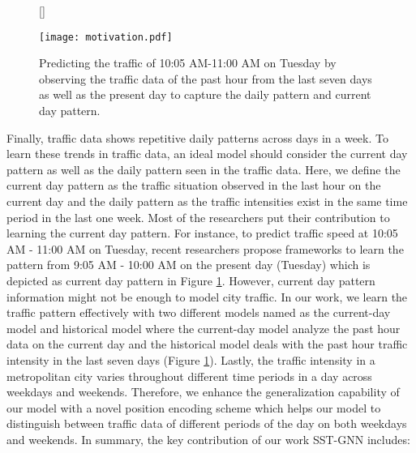 \documentclass[runningheads]{llncs}
\begin{document}
\begin{figure}[t]
[\FBwidth]
{\caption{\small Predicting the traffic of 10:05 AM-11:00 AM on Tuesday by observing the traffic data of the past hour from the last seven days as well as the present day to capture the daily pattern and current day pattern.}
\label{fig:motivation_his_cur}}
{\texttt{[image: motivation.pdf]}}
\end{figure}

Finally, traffic data shows repetitive daily patterns across days in a week. To learn these trends in traffic data, an ideal model should consider the current day pattern as well as the daily pattern seen in the traffic data.  Here, we define the current day pattern as the traffic situation  observed in the last hour on the current day and the daily pattern as the traffic intensities exist in the same time period in the last one week. Most of the researchers put their contribution to learning the current day pattern. For instance, to predict traffic speed at 10:05 AM - 11:00 AM on Tuesday, recent researchers propose frameworks to learn the pattern from 9:05 AM - 10:00 AM on the present day (Tuesday) which is depicted  as current day pattern in Figure \ref{fig:motivation_his_cur}. However, current day pattern information might not be enough to model city traffic.  In our work, we learn the traffic pattern effectively with two different models named as the current-day model and historical model where the current-day model analyze the past hour data on the current day and the historical model deals with the past hour traffic intensity in the last seven days (Figure \ref{fig:motivation_his_cur}). Lastly, the traffic intensity in a metropolitan city varies throughout different time periods in a day across weekdays and weekends. Therefore, we enhance the generalization capability of our model with a novel position encoding scheme which helps our model to distinguish between traffic data of different periods of the day on both weekdays and weekends.  In summary,  the key contribution of our work SST-GNN includes: 
\end{document}
